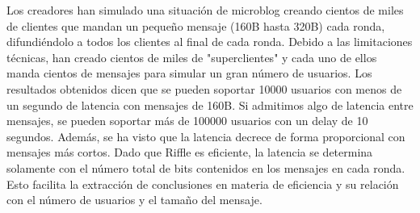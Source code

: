  Los creadores han simulado una situación de microblog creando cientos de miles de clientes que mandan un pequeño mensaje (160B hasta 320B) cada ronda, difundiéndolo a todos los clientes al final de cada ronda. Debido a las limitaciones técnicas, han creado cientos de miles de "superclientes" y cada uno de ellos manda cientos de mensajes para simular un gran número de usuarios. Los resultados obtenidos dicen que se pueden soportar 10000 usuarios con menos de un segundo de latencia con mensajes de 160B. Si admitimos algo de latencia entre mensajes, se pueden soportar más de 100000 usuarios con un delay de 10 segundos. Además, se ha visto que la latencia decrece de forma proporcional con mensajes más cortos. Dado que Riffle es eficiente, la latencia se determina solamente con el número total de bits contenidos en los mensajes en cada ronda. Esto facilita la extracción de conclusiones en materia de eficiencia y su relación con el número de usuarios y el tamaño del mensaje. 
 
 